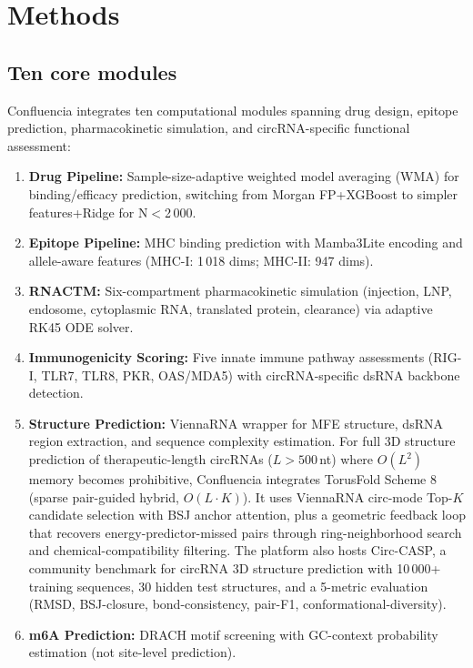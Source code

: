
\section{Methods}

\subsection*{Ten core modules}
Confluencia integrates ten computational modules spanning drug design, epitope prediction, pharmacokinetic simulation, and circRNA-specific functional assessment:

\begin{enumerate}[noitemsep,topsep=0pt]
\item \textbf{Drug Pipeline:} Sample-size-adaptive weighted model averaging (WMA) for binding/efficacy prediction, switching from Morgan FP+XGBoost to simpler features+Ridge for N$<$2\,000.
\item \textbf{Epitope Pipeline:} MHC binding prediction with Mamba3Lite encoding and allele-aware features (MHC-I: 1\,018 dims; MHC-II: 947 dims).
\item \textbf{RNACTM:} Six-compartment pharmacokinetic simulation (injection, LNP, endosome, cytoplasmic RNA, translated protein, clearance) via adaptive RK45 ODE solver.
\item \textbf{Immunogenicity Scoring:} Five innate immune pathway assessments (RIG-I, TLR7, TLR8, PKR, OAS/MDA5) with circRNA-specific dsRNA backbone detection.
\item \textbf{Structure Prediction:} ViennaRNA wrapper for MFE structure, dsRNA region extraction, and sequence complexity estimation. For full 3D structure prediction of therapeutic-length circRNAs ($L>500$\,nt) where $O(L^2)$ memory becomes prohibitive, Confluencia integrates TorusFold Scheme 8 (sparse pair-guided hybrid, $O(L \cdot K)$). It uses ViennaRNA circ-mode Top-$K$ candidate selection with BSJ anchor attention, plus a geometric feedback loop that recovers energy-predictor-missed pairs through ring-neighborhood search and chemical-compatibility filtering. The platform also hosts Circ-CASP, a community benchmark for circRNA 3D structure prediction with 10\,000+ training sequences, 30 hidden test structures, and a 5-metric evaluation (RMSD, BSJ-closure, bond-consistency, pair-F1, conformational-diversity).
\item \textbf{m6A Prediction:} DRACH motif screening with GC-context probability estimation (not site-level prediction).

\end{enumerate}

